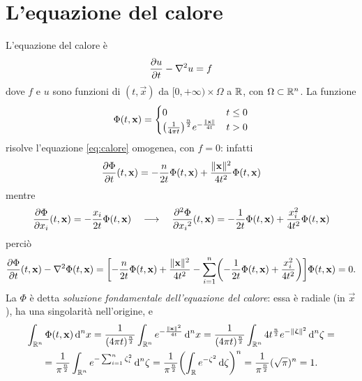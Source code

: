 \chapter{L'equazione del calore}
\label{ch:calore}
\newcommand{\sfc}{\Phi} %

L'equazione del calore è
\begin{equation}
    \frac{\partial {u}}{\partial {t}}-\nabla^2 u=f
    \label{eq:calore}
\end{equation}
dove $f$ e $u$ sono funzioni di $(t,\vec x)$ da $[0,+\infty)\times\Omega$ a $\mathbb{R}$, con $\Omega\subset\mathbb{R}^n$.
La funzione
\begin{equation}
    \sfc(t,\vec x)=
    \begin{cases}
        0                                                                   & t\le 0\\
        \bigl(\frac1{4\pi t}\bigr)^\frac{n}2e^{-\frac{\norm{\vec x}}{4t}} & t>0
    \end{cases}
    \label{eq:soluzione-fondamentale-calore}
\end{equation}
risolve l'equazione \eqref{eq:calore} omogenea, con $f=0$: infatti
\begin{equation}
    \drp{\sfc}{t}(t,\vec x)=
    -\frac{n}{2t}\sfc(t,\vec x)+\frac{\norm{\vec x}^2}{4t^2}\sfc(t,\vec x)
\end{equation}
mentre
\begin{equation}
    \drp{\sfc}{x_i}(t,\vec x)=
    -\frac{x_i}{2t}\sfc(t,\vec x)
    \qqq
    \ddrp{\sfc}{x_i}(t,\vec x)=
    -\frac1{2t}\sfc(t,\vec x)+\frac{x_i^2}{4t^2}\sfc(t,\vec x)
\end{equation}
perciò
\begin{equation}
    \drp{\sfc}{t}(t,\vec x)-\lap\sfc(t,\vec x)=
    \biggl[-\frac{n}{2t}\sfc(t,\vec x)+\frac{\norm{\vec x}^2}{4t^2}-\sum_{i=1}^n\biggl(-\frac1{2t}\sfc(t,\vec x)+\frac{x_i^2}{4t^2}\biggr)\biggr]\sfc(t,\vec x)=
    0.
\end{equation}
La $\sfc$ è detta \emph{soluzione fondamentale dell'equazione del calore}: essa è radiale (in $\vec x$), ha una singolarità nell'origine, e
\begin{multline}
    \int_{\R^n}\sfc(t,\vec x)\,\dd^n x=
    \frac1{(4\pi t)^\frac{n}2}\int_{\R^n}e^{-\frac{\norm{\vec x}^2}{4t}}\,\dd^n x=
    \frac1{(4\pi t)^\frac{n}2}\int_{\R^n}4t^\frac{n}2e^{-\norm{\vzeta}^2}\,\dd^n\zeta=\\=
    \frac1{\pi^\frac{n}2}\int_{\R^n}e^{-\sum_{i=1}^n\zeta_i^2}\,\dd^n\zeta=
    \frac1{\pi^\frac{n}2}\biggl(\int_\R e^{-\zeta^2}\,\dd\zeta\biggr)^n=
    \frac1{\pi^\frac{n}2}(\sqrt{\pi})^n=
    1.
\end{multline}
